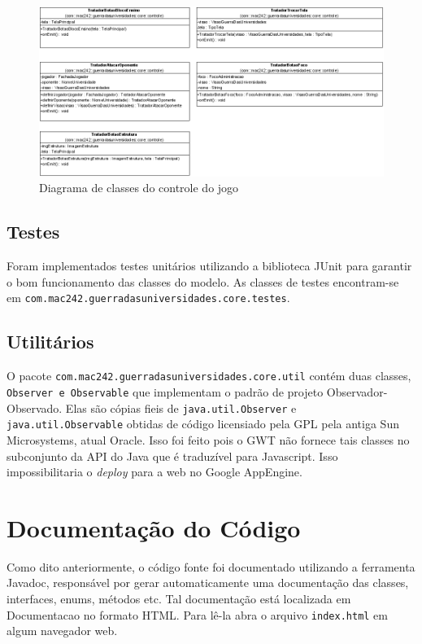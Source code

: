 \documentclass[brazil,times]{abnt}
\begin{document}
\begin{figure}[htp]
\begin{center}
  \includegraphics[width=\textwidth]{imagens/Controle.png}
  \caption[Diagrama de classes do controle do jogo]{Diagrama de classes do
  controle do jogo}
  \label{modelo-basico}
\end{center}
\end{figure}

\section{Testes}
Foram implementados testes unitários utilizando a biblioteca JUnit para
garantir o bom funcionamento das classes do modelo. As classes de testes
encontram-se em \texttt{com.mac242.guerradasuniversidades.core.testes}.

\section{Utilitários}
O pacote \texttt{com.mac242.guerradasuniversidades.core.util} contém duas
classes, \texttt{Observer e Observable} que implementam o padrão de projeto
Observador-Observado. Elas são cópias fieis de \texttt{java.util.Observer}
e \texttt{java.util.Observable} obtidas de código licensiado pela GPL pela
antiga Sun Microsystems, atual Oracle. Isso foi feito pois o GWT não fornece
tais classes no subconjunto da API do Java que é traduzível para Javascript.
Isso impossibilitaria o \emph{deploy} para a web no Google AppEngine.


\chapter{Documentação do Código}\label{documentacao-codigo}
Como dito anteriormente, o código fonte foi documentado utilizando a ferramenta
Javadoc, responsável por gerar automaticamente uma documentação das classes,
interfaces, enums, métodos etc. Tal documentação está localizada em Documentacao
no formato HTML. Para lê-la abra o arquivo \texttt{index.html} em algum
navegador web.



\end{document}
